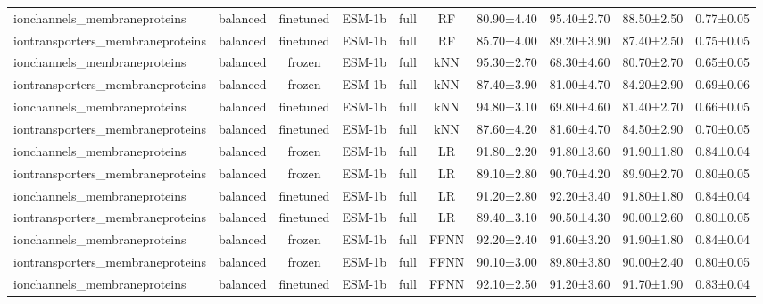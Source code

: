\begin{tabular}{lcccccc}
    ionchannels\_membraneproteins &   balanced &      finetuned &       ESM-1b &      full &         RF &  80.90±4.40 &  95.40±2.70 &  88.50±2.50 & 0.77±0.05 \\
iontransporters\_membraneproteins &   balanced &      finetuned &       ESM-1b &      full &         RF &  85.70±4.00 &  89.20±3.90 &  87.40±2.50 & 0.75±0.05 \\
    ionchannels\_membraneproteins &   balanced &         frozen &       ESM-1b &      full &        kNN &  95.30±2.70 &  68.30±4.60 &  80.70±2.70 & 0.65±0.05 \\
iontransporters\_membraneproteins &   balanced &         frozen &       ESM-1b &      full &        kNN &  87.40±3.90 &  81.00±4.70 &  84.20±2.90 & 0.69±0.06 \\
    ionchannels\_membraneproteins &   balanced &      finetuned &       ESM-1b &      full &        kNN &  94.80±3.10 &  69.80±4.60 &  81.40±2.70 & 0.66±0.05 \\
iontransporters\_membraneproteins &   balanced &      finetuned &       ESM-1b &      full &        kNN &  87.60±4.20 &  81.60±4.70 &  84.50±2.90 & 0.70±0.05 \\
    ionchannels\_membraneproteins &   balanced &         frozen &       ESM-1b &      full &         LR &  91.80±2.20 &  91.80±3.60 &  91.90±1.80 & 0.84±0.04 \\
iontransporters\_membraneproteins &   balanced &         frozen &       ESM-1b &      full &         LR &  89.10±2.80 &  90.70±4.20 &  89.90±2.70 & 0.80±0.05 \\
    ionchannels\_membraneproteins &   balanced &      finetuned &       ESM-1b &      full &         LR &  91.20±2.80 &  92.20±3.40 &  91.80±1.80 & 0.84±0.04 \\
iontransporters\_membraneproteins &   balanced &      finetuned &       ESM-1b &      full &         LR &  89.40±3.10 &  90.50±4.30 &  90.00±2.60 & 0.80±0.05 \\
    ionchannels\_membraneproteins &   balanced &         frozen &       ESM-1b &      full &       FFNN &  92.20±2.40 &  91.60±3.20 &  91.90±1.80 & 0.84±0.04 \\
iontransporters\_membraneproteins &   balanced &         frozen &       ESM-1b &      full &       FFNN &  90.10±3.00 &  89.80±3.80 &  90.00±2.40 & 0.80±0.05 \\
    ionchannels\_membraneproteins &   balanced &      finetuned &       ESM-1b &      full &       FFNN &  92.10±2.50 &  91.20±3.60 &  91.70±1.90 & 0.83±0.04 \\

\end{tabular}
